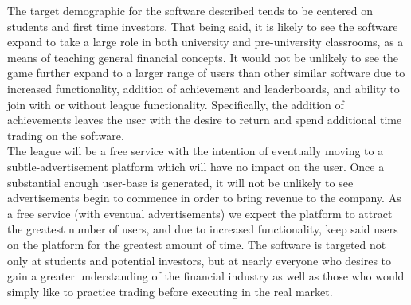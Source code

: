 The target demographic for the software described tends to be centered on students and
first time investors. That being said, it is likely to see the software expand to take
a large role in both university and pre-university classrooms, as a means of teaching
general financial concepts. It would not be unlikely to see the game further expand to
a larger range of users than other similar software due to increased functionality,
addition of achievement and leaderboards, and ability to join with or without league
functionality. Specifically, the addition of achievements leaves the user with the
desire to return and spend additional time trading on the software.\\

The league will be a free service with the intention of eventually moving to a
subtle-advertisement platform which will have no impact on the user. Once a
substantial enough user-base is generated, it will not be unlikely to see
advertisements begin to commence in order to bring revenue to the company. As a free
service (with eventual advertisements) we expect the platform to attract the greatest
number of users, and due to increased functionality, keep said users on the platform
for the greatest amount of time. The software is targeted not only at students and
potential investors, but at nearly everyone who desires to gain a greater understanding
of the financial industry as well as those who would simply like to practice trading
before executing in the real market.\\

